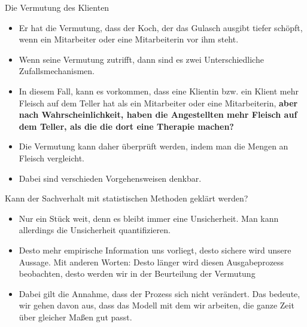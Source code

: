 \documentclass[usenames,dvipsnames,handout]{beamer}
\begin{document}
\begin{frame}{Die Vermutung des Klienten}
\begin{itemize}
\item{Er hat die Vermutung, dass der Koch, der das Gulasch ausgibt tiefer schöpft, wenn ein Mitarbeiter oder eine Mitarbeiterin 
vor ihm steht.}\pause
\item{Wenn seine Vermutung zutrifft, dann sind es zwei Unterschiedliche Zufallsmechanismen.}\pause
\item{In diesem Fall, kann es vorkommen, dass eine Klientin bzw. ein Klient mehr Fleisch auf dem Teller
hat als ein Mitarbeiter oder eine Mitarbeiterin, \textbf{aber nach Wahrscheinlichkeit, haben die Angestellten mehr
Fleisch auf dem Teller, als die die dort eine Therapie machen?}}\pause
\item{Die Vermutung kann daher überprüft werden, indem man die Mengen an Fleisch vergleicht.}\pause
\item{Dabei sind verschieden Vorgehensweisen denkbar.}
\end{itemize}
\end{frame}

\begin{frame}{Kann der Sachverhalt mit statistischen Methoden geklärt werden?}
\begin{itemize}
\item{Nur ein Stück weit, denn es bleibt immer eine Unsicherheit. Man kann allerdings
die Unsicherheit quantifizieren.}\pause
\item{Desto mehr empirische Information uns vorliegt, desto sichere wird unsere Aussage. Mit anderen Worten:
Desto länger wird diesen Ausgabeprozess beobachten, desto werden wir in der Beurteilung der Vermutung 
}\pause
\item{Dabei gilt die Annahme, dass der Prozess sich nicht verändert. Das bedeute, wir gehen davon aus, dass das Modell mit dem wir arbeiten,
die ganze Zeit über gleicher Maßen gut passt.}\pause
\end{itemize}
\end{frame}
\end{document}
